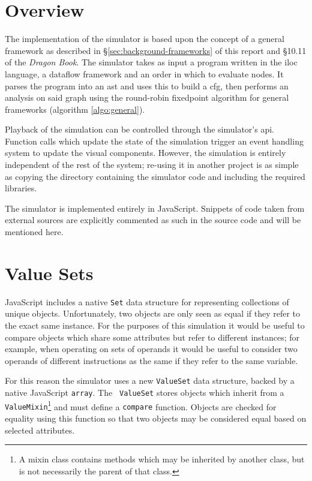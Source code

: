 \documentclass[bsc,twoside,singlespacing,parskip,logo,notimes,normalheadings]{infthesis}
\begin{document}
    \section{Overview}
    The implementation of the simulator is based upon the concept of a
    general framework as described in
    \S\ref{sec:background-frameworks} of this report and \S10.11 of
    the {\em Dragon Book}\cite{dragonbook}. The simulator takes as
    input a program written in the \gls{iloc} language, a
    \gls{dataflow} framework and an order in which to evaluate
    nodes. It parses the program into an \gls{ast} and uses this to
    build a \gls{cfg}, then performs an analysis on said graph using
    the round-robin \gls{fixedpoint} algorithm for general frameworks
    (algorithm \ref{algo:general}).

    Playback of the simulation can be controlled through the
    simulator's \gls{api}. Function calls which update the state of
    the simulation trigger an event handling system to update the
    visual components. However, the simulation is entirely independent
    of the rest of the system; re-using it in another project is as
    simple as copying the directory containing the simulator code and
    including the required libraries.

    The simulator is implemented entirely in JavaScript. Snippets of
    code taken from external sources are explicitly commented as such
    in the source code and will be mentioned here.

    \section{Value Sets}

    JavaScript includes a native {\tt Set} data structure for
    representing collections of unique objects. Unfortunately, two
    objects are only seen as equal if they refer to the exact same
    instance. For the purposes of this simulation it would be useful
    to compare objects which share some attributes but refer to
    different instances; for example, when operating on sets of
    operands it would be useful to consider two operands of different
    instructions as the same if they refer to the same variable.

    For this reason the simulator uses a new {\tt ValueSet} data
    structure, backed by a native JavaScript {\tt array}. The {\tt
      ValueSet} stores objects which inherit from a {\tt
      ValueMixin}\footnote{A mixin class contains methods which may be
      inherited by another class, but is not necessarily the parent of
      that class.} and must define a {\tt compare} function. Objects
    are checked for equality using this function so that two objects
    may be considered equal based on selected attributes.
\end{document}
